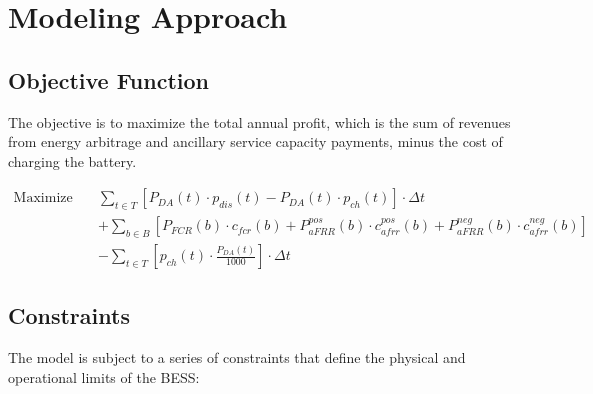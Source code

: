 \section{Modeling Approach}



\subsection{Objective Function}
The objective is to maximize the total annual profit, which is the sum of revenues from energy arbitrage and ancillary service capacity payments, minus the cost of charging the battery.

\begin{align}
\text{Maximize} \quad & \sum_{t \in T} \left[ P_{DA}(t) \cdot p_{dis}(t) - P_{DA}(t) \cdot p_{ch}(t) \right] \cdot \Delta t \\
&+ \sum_{b \in B} \left[ P_{FCR}(b) \cdot c_{fcr}(b) + P_{aFRR}^{pos}(b) \cdot c_{afrr}^{pos}(b) + P_{aFRR}^{neg}(b) \cdot c_{afrr}^{neg}(b) \right] \\
&- \sum_{t \in T} \left[ p_{ch}(t) \cdot \frac{P_{DA}(t)}{1000} \right] \cdot \Delta t
\end{align}

\subsection{Constraints}
The model is subject to a series of constraints that define the physical and operational limits of the BESS:

